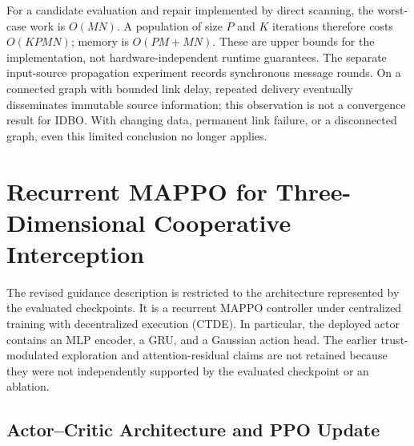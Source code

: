\documentclass[lettersize,journal]{IEEEtran}
\begin{document}
For a candidate evaluation and repair implemented by direct scanning, the
worst-case work is \(O(MN)\). A population of size \(P\) and \(K\) iterations
therefore costs \(O(KPMN)\); memory is \(O(PM+MN)\). These are upper bounds for
the implementation, not hardware-independent runtime guarantees. The separate
input-source propagation experiment records synchronous message rounds. On a
connected graph with bounded link delay, repeated delivery eventually
disseminates immutable source information; this observation is not a convergence
result for IDBO. With changing data, permanent link failure, or a disconnected
graph, even this limited conclusion no longer applies.

\section{Recurrent MAPPO for Three-Dimensional Cooperative Interception}
\label{sec:cooperative_algorithm}

The revised guidance description is restricted to the architecture represented by
the evaluated checkpoints. It is a recurrent MAPPO controller under centralized
training with decentralized execution (CTDE). In particular, the deployed actor
contains an MLP encoder, a GRU, and a Gaussian action head. The earlier
trust-modulated exploration and attention-residual claims are not retained because
they were not independently supported by the evaluated checkpoint or an ablation.

\subsection{Actor--Critic Architecture and PPO Update}
\end{document}
